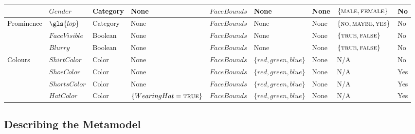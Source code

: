 \begin{landscape}
\begin{table}[p]
{\begin{tabular}{lllllllll}
        &
        $Gender$ &
        Category &
        None &
        $FaceBounds$ &
        None &
        None &
        $\{ \textsc{male}, \textsc{female} \} $&
        No
      \\
      \midrule
        \multirow{2}{*}{Prominence} &
        $\gls{lop}$ &
        Category &
        None &
        $FaceBounds$ &
        None &
        None &
        $\{ \textsc{no}, \textsc{maybe}, \textsc{yes} \}$ &
        No
      \\
        &
        $FaceVisible$ &
        Boolean &
        None &
        $FaceBounds$ &
        None &
        None &
        $\{ \textsc{true}, \textsc{false} \}$&
        No
      \\
        &
        $Blurry$ &
        Boolean &
        None &
        $FaceBounds$ &
        None &
        None &
        $\{ \textsc{true}, \textsc{false} \}$&
        No
      \\
      \midrule
        \multirow{2}{*}{Colours} &
        $ShirtColor$ &
        Color &
        None &
        $FaceBounds$ &
        $\{ red, green, blue \}$ &
        None &
        N/A &
        No
      \\
        &
        $ShoeColor$ &
        Color &
        None &
        $FaceBounds$ &
        $\{ red, green, blue \}$ &
        None &
        N/A &
        Yes
      \\
        &
        $ShortsColor$ &
        Color &
        None &
        $FaceBounds$ &
        $\{ red, green, blue \}$ &
        None &
        N/A &
        Yes
      \\
        &
        $HatColor$ &
        Color &
        $\{ WearingHat = \textsc{true} \}$ &
        $FaceBounds$ &
        $\{ red, green, blue \}$ &
        None &
        N/A &
        Yes
      \\
      \bottomrule
    \end{tabular}
  }
\end{table}

\end{landscape}


\subsection{Describing the Metamodel}
\label{sec:dataset:architecture:metamodel}

